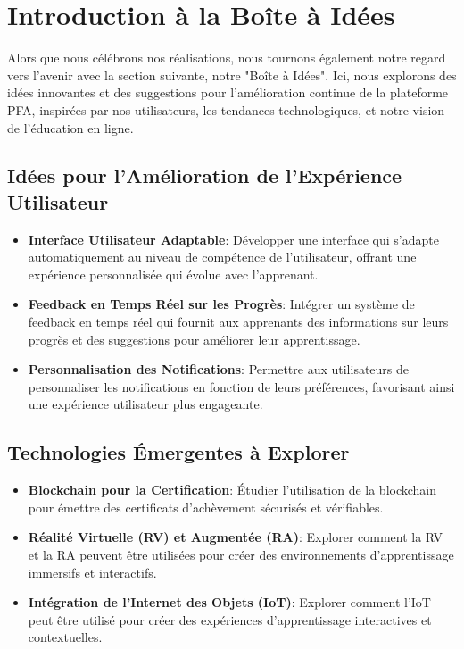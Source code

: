 \section{Introduction à la Boîte à Idées}

\label{part:ideabox}
Alors que nous célébrons nos réalisations, nous tournons également notre regard vers l'avenir avec la section suivante, notre "Boîte à Idées". Ici, nous explorons des idées innovantes et des suggestions pour l'amélioration continue de la plateforme PFA, inspirées par nos utilisateurs, les tendances technologiques, et notre vision de l'éducation en ligne.

\subsection{Idées pour l'Amélioration de l'Expérience Utilisateur}
\begin{itemize}[leftmargin=*,label=\textbullet,font=\color{violet}]
    \item \textbf{Interface Utilisateur Adaptable}: Développer une interface qui s'adapte automatiquement au niveau de compétence de l'utilisateur, offrant une expérience personnalisée qui évolue avec l'apprenant.
    \item \textbf{Feedback en Temps Réel sur les Progrès}: Intégrer un système de feedback en temps réel qui fournit aux apprenants des informations sur leurs progrès et des suggestions pour améliorer leur apprentissage.
    \item \textbf{Personnalisation des Notifications}: Permettre aux utilisateurs de personnaliser les notifications en fonction de leurs préférences, favorisant ainsi une expérience utilisateur plus engageante.
\end{itemize}

\subsection{Technologies Émergentes à Explorer}
\begin{itemize}[leftmargin=*,label=\textbullet,font=\color{violet}]
    \item \textbf{Blockchain pour la Certification}: Étudier l'utilisation de la blockchain pour émettre des certificats d'achèvement sécurisés et vérifiables.
    \item \textbf{Réalité Virtuelle (RV) et Augmentée (RA)}: Explorer comment la RV et la RA peuvent être utilisées pour créer des environnements d'apprentissage immersifs et interactifs.
    \item \textbf{Intégration de l'Internet des Objets (IoT)}: Explorer comment l'IoT peut être utilisé pour créer des expériences d'apprentissage interactives et contextuelles.
\end{itemize}

